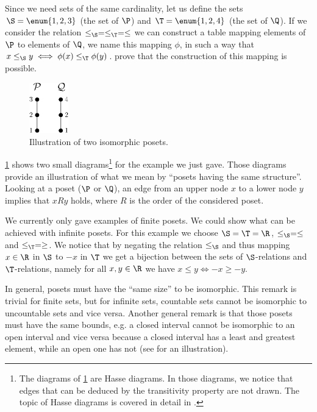 Since we need sets of the same cardinality, let us define the sets $\S = \enum{1, 2,
3}$ (the set of $\P$) and $\T = \enum{1, 2, 4}$ (the set of $\Q$). If we consider
the relation $\le_{\S} = \le_{\T} = \le$ we can construct a table mapping elements of
$\P$ to elements of $\Q$, we name this mapping $\phi$, in such a way that $x
\le_{\S} y \iff \phi(x) \le_{\T} \phi(y)$. 
prove that the construction of this mapping is possible.

\begin{figure}
	\centering
	\includegraphics[width=0.15\textwidth]{fig/poset/iso/a}
	\caption{Illustration of two isomorphic posets.}
	\label{fig:poset:iso:a}
\end{figure}

\ref{fig:poset:iso:a} shows two small
diagrams\footnote{The diagrams of \ref{fig:poset:iso:a} are Hasse diagrams. In those diagrams, we
notice that edges that can be deduced by the transitivity property are not
drawn. The topic of Hasse diagrams is covered in detail in
.}
for the example we just gave.
Those diagrams provide an illustration of what we mean by ``posets having
the same structure''. Looking at a poset ($\P$ or $\Q$), an edge from an upper
node $x$ to a lower node $y$ implies that $x R y$ holds, where $R$ is the order
of the considered poset.

We currently only gave examples of finite posets. We could show what can be
achieved with infinite posets. For this example we choose $\S = \T = \R$,
$\le_{\S} = \le$ and $\le_{\T} = \ge$. We notice that by negating the relation
$\le_{\S}$ and thus mapping $x \in \R$ in $\S$ to $-x$ in $\T$ we get a
bijection between the sets of $\S$-relations and $\T$-relations, namely for all
$x, y \in \R$ we have $x \le y \iff -x \ge -y$.

In general, posets must have the ``same size'' to be isomorphic. This remark
is trivial for finite sets, but for infinite sets, countable sets cannot be
isomorphic to uncountable sets and vice versa. Another general remark is that
those posets must have the same bounds, e.g. a closed interval cannot be
isomorphic to an open interval and vice versa because a closed interval has a
least and greatest element, while an open one has not (see
 for an illustration).

